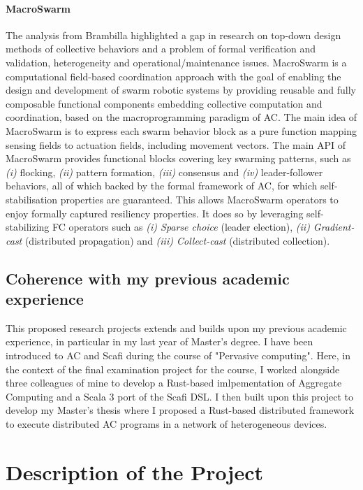 \documentclass[12pt]{article}
\begin{document}
\paragraph{\textbf{MacroSwarm}} The analysis from Brambilla\cite{brambilla2013swarm} highlighted a gap in research on top-down design methods of collective behaviors and a problem of
formal verification and validation, heterogeneity and operational/maintenance issues.  
MacroSwarm\cite{aguzzi2023macroswarm} is a computational field-based coordination approach with the goal of enabling the design and development of swarm robotic systems by
providing reusable and fully composable functional components embedding collective computation and coordination, based on the macroprogramming paradigm of AC.
The main idea of MacroSwarm is to express each swarm behavior block as a pure function mapping sensing fields to actuation fields, including movement vectors.
The main API of MacroSwarm provides functional blocks covering key swarming patterns, such as \textit{(i)} flocking, \textit{(ii)} pattern formation, \textit{(iii)} consensus and \textit{(iv)} leader-follower behaviors, 
all of which backed by the formal framework of AC, for which self-stabilisation properties are guaranteed. This allows MacroSwarm operators to enjoy formally captured resiliency properties.
It does so by leveraging self-stabilizing FC operators such as \textit{(i) Sparse choice} (leader election), \textit{(ii) Gradient-cast} (distributed propagation) and \textit{(iii) Collect-cast} (distributed collection). 

\subsection{Coherence with my previous academic experience}
This proposed research projects extends and builds upon my previous academic experience, in particular in my last year of Master's degree.
I have been introduced to AC and Scafi during the course of "Pervasive computing". Here, in the context of the final examination project for the course,
I worked alongside three colleagues of mine to develop a Rust-based imlpementation of Aggregate Computing and a Scala 3 port of the Scafi DSL.
I then built upon this project to develop my Master's thesis where I proposed a Rust-based distributed framework to execute distributed AC programs in a network of
heterogeneous devices.

\newpage
\section{Description of the Project}
\end{document}
